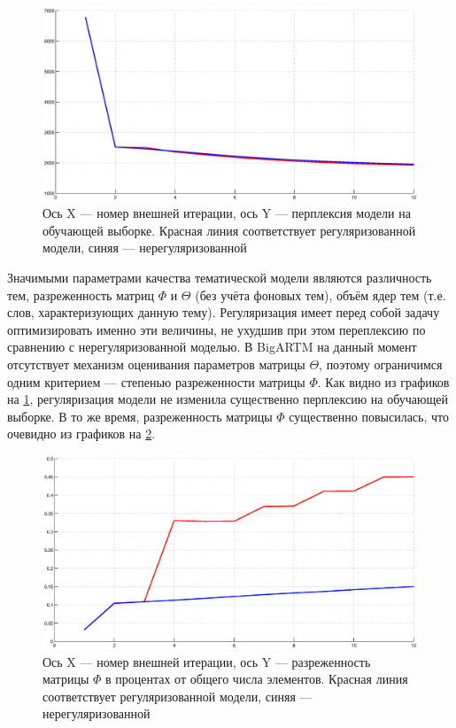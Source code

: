 \begin{figure}[h!]\center
\includegraphics[scale = 0.5]{perplexity.eps}
\caption{Ось X --- номер внешней итерации, ось Y --- перплексия модели на обучающей выборке. Красная линия соответствует регуляризованной модели, синяя --- нерегуляризованной}
\label{pic_1}
\end{figure}

Значимыми параметрами качества тематической модели являются различность тем, разреженность матриц $\Phi$ и $\Theta$ (без учёта фоновых тем), объём ядер тем (т.е. слов, характеризующих данную тему). Регуляризация имеет перед собой задачу оптимизировать именно эти величины, не ухудшив при этом переплексию по сравнению с нерегуляризованной моделью. В BigARTM на данный момент отсутствует механизм оценивания параметров матрицы $\Theta$, поэтому ограничимся одним критерием --- степенью разреженности матрицы $\Phi$. Как видно из графиков на \ref{pic_1}, регуляризация модели не изменила существенно перплексию на обучающей выборке. В то же время, разреженность матрицы $\Phi$ существенно повысилась, что очевидно из графиков на \ref{pic_2}.

\begin{figure}[h!]\center
\includegraphics[scale = 0.5]{sparsity.eps}
\caption{Ось X --- номер внешней итерации, ось Y --- разреженность матрицы $\Phi$ в процентах от общего числа элементов. Красная линия соответствует регуляризованной модели, синяя --- нерегуляризованной}
\label{pic_2}
\end{figure}